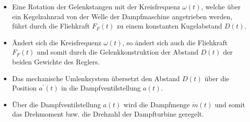 %
\begin{itemize}
%
\item Eine Rotation der Gelenkstangen mit der Kreisfrequenz $\omega(t)$, welche über ein Kegelzahnrad von der Welle der Dampfmaschine angetrieben werden, führt durch die Fliehkraft $F_{F}(t)$ zu einem konstanten Kugelabstand $D(t)$.
%
\item Ändert sich die Kreisfrequenz $\omega(t)$, so ändert sich auch die Fliehkraft $F_{F}(t)$ und somit durch die Gelenkkonstruktion der Abstand $D(t)$ der beiden Gewichte des Reglers.
%
\item Das mechanische Umlenksystem übersetzt den Abstand $D(t)$ über  die Position $a^{'}(t)$ in die Dampfventilstellung $a(t)$.
%
\item Über die Dampfventilstellung $a(t)$ wird die Dampfmenge $\dot{m}(t)$ und somit das Drehmoment bzw. die Drehzahl der Dampfturbine geregelt.  
%
\end{itemize}
%
%
